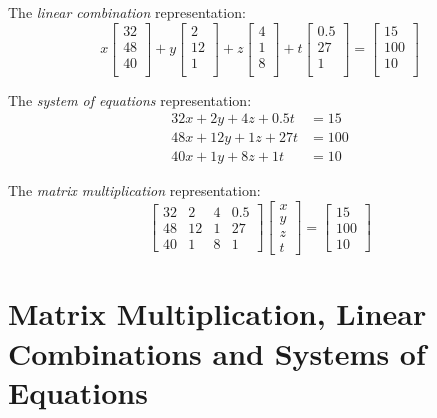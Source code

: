 \documentclass[12pt]{article}
\begin{document}
The \emph{linear combination} representation:
\[
x\left[\begin{matrix} 32  \\ 48 \\ 40 \\ \end{matrix}\right]+
y\left[\begin{matrix}  2  \\ 12 \\  1 \\ \end{matrix}\right]+
z\left[\begin{matrix}  4  \\  1 \\  8 \\ \end{matrix}\right]+
t\left[\begin{matrix} 0.5 \\ 27 \\  1 \\ \end{matrix}\right]=
\left[\begin{matrix} 15  \\ 100 \\ 10 \\ \end{matrix}\right]
\]

The \emph{system of equations} representation:
\begin{align*}
32x+2y+4z+0.5t &= 15\\
48x+12y+1z+27t &= 100\\
40x+1y+8z+1t   &= 10
\end{align*}

The \emph{matrix multiplication} representation:
\[
\begin{bmatrix}
32 & 2 & 4 & 0.5\\
48 & 12 & 1 & 27\\
40 & 1 & 8 & 1
\end{bmatrix}
\begin{bmatrix}x\\y\\z\\t\end{bmatrix}=
\begin{bmatrix}
15 \\ 100 \\ 10
\end{bmatrix}
\]

\section{Matrix Multiplication, Linear Combinations and Systems of Equations}
\end{document}
